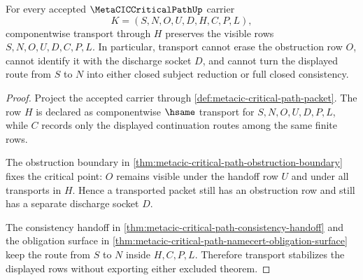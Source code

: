 \begin{theorem}
\label{thm:metacic-critical-path-transport-row-stability}
For every accepted $\MetaCICCriticalPathUp$ carrier
$$
K=(S,N,O,U,D,H,C,P,L),
$$
componentwise transport through $H$ preserves the visible rows $S,N,O,U,D,C,P,L$. In particular, transport cannot erase the obstruction row $O$, cannot identify it with the discharge socket $D$, and cannot turn the displayed route from $S$ to $N$ into either closed subject reduction or full closed consistency.
\end{theorem}
\begin{proof}
Project the accepted carrier through \autoref{def:metacic-critical-path-packet}. The row $H$ is declared as componentwise $\hsame$ transport for $S,N,O,U,D,P,L$, while $C$ records only the displayed continuation routes among the same finite rows.

The obstruction boundary in \autoref{thm:metacic-critical-path-obstruction-boundary} fixes the critical point: $O$ remains visible under the handoff row $U$ and under all transports in $H$. Hence a transported packet still has an obstruction row and still has a separate discharge socket $D$.

The consistency handoff in \autoref{thm:metacic-critical-path-consistency-handoff} and the obligation surface in \autoref{thm:metacic-critical-path-namecert-obligation-surface} keep the route from $S$ to $N$ inside $H,C,P,L$. Therefore transport stabilizes the displayed rows without exporting either excluded theorem.
\end{proof}

